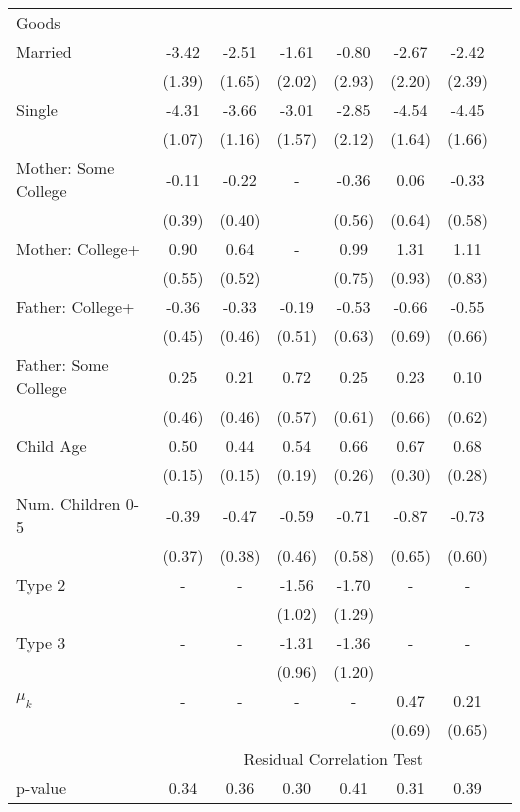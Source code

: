 \begin{tabular}{lccccccc}
Goods}\\\cmidrule(r){2-8}Married&-3.42&-2.51&-1.61&-0.80&-2.67&-2.42&\\&(1.39)&(1.65)&(2.02)&(2.93)&(2.20)&(2.39)&\\Single&-4.31&-3.66&-3.01&-2.85&-4.54&-4.45&\\&(1.07)&(1.16)&(1.57)&(2.12)&(1.64)&(1.66)&\\Mother: Some College&-0.11&-0.22&-&-0.36&0.06&-0.33&\\&(0.39)&(0.40)&&(0.56)&(0.64)&(0.58)&\\Mother: College+&0.90&0.64&-&0.99&1.31&1.11&\\&(0.55)&(0.52)&&(0.75)&(0.93)&(0.83)&\\Father: College+&-0.36&-0.33&-0.19&-0.53&-0.66&-0.55&\\&(0.45)&(0.46)&(0.51)&(0.63)&(0.69)&(0.66)&\\Father: Some College&0.25&0.21&0.72&0.25&0.23&0.10&\\&(0.46)&(0.46)&(0.57)&(0.61)&(0.66)&(0.62)&\\Child Age&0.50&0.44&0.54&0.66&0.67&0.68&\\&(0.15)&(0.15)&(0.19)&(0.26)&(0.30)&(0.28)&\\Num. Children 0-5&-0.39&-0.47&-0.59&-0.71&-0.87&-0.73&\\&(0.37)&(0.38)&(0.46)&(0.58)&(0.65)&(0.60)&\\Type 2&-&-&-1.56&-1.70&-&-&\\&&&(1.02)&(1.29)&&&\\Type 3&-&-&-1.31&-1.36&-&-&\\&&&(0.96)&(1.20)&&&\\$\mu_{k}$&-&-&-&-&0.47&0.21&\\&&&&&(0.69)&(0.65)&\\& \multicolumn{7}{c}{Residual Correlation Test}\\\cmidrule(r){2-8}p-value&0.34&0.36&0.30&0.41&0.31&0.39&\\
\bottomrule\end{tabular}